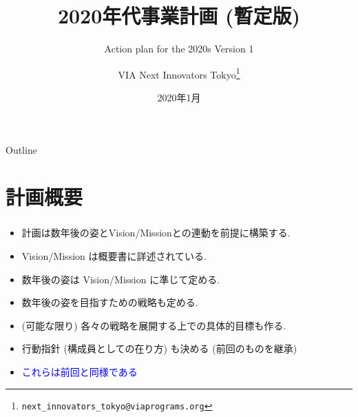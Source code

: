 \documentclass[dvipdfmx,10pt]{beamer}
\title{2020年代事業計画 (暫定版)}
\subtitle{Action plan for the 2020s Version 1}
\author[VIA Next Innovators Tokyo]{VIA Next Innovators Tokyo\footnote{\texttt{next\_innovators\_tokyo@viaprograms.org}}}
\date[2020年1月]{2020年1月}
\newcommand{\ft}{\frametitle}
\begin{document}
\begin{frame}
\titlepage
\end{frame}
\begin{frame}{Outline}
  \setcounter{tocdepth}{3}  
  \tableofcontents[
    sectionstyle=show,
    subsectionstyle=show/show,
    subsubsectionstyle=show/show/show
    ]
\end{frame}
\section{計画概要}
\begin{frame}\ft{\insertsection}
\begin{itemize}
\item 計画は数年後の姿とVision/Missionとの連動を前提に構築する.
\item Vision/Mission は概要書に詳述されている.
\item 数年後の姿は Vision/Mission に準じて定める.
\item 数年後の姿を目指すための戦略も定める.
\item (可能な限り) 各々の戦略を展開する上での具体的目標も作る.
\item 行動指針 (構成員としての在り方) も決める (前回のものを継承)
\item \textcolor{blue}{これらは前回と同様である}
\end{itemize}

\end{frame}
\end{document}

